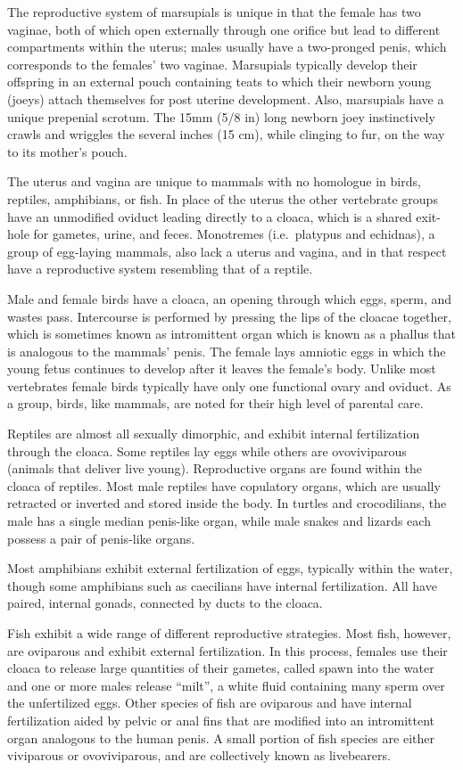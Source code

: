 The reproductive system of marsupials is unique in that the female has two vaginae, both of which open externally through one orifice but lead to different compartments within the uterus; males usually have a two-pronged penis, which corresponds to the females' two vaginae. Marsupials typically develop their offspring in an external pouch containing teats to which their newborn young (joeys) attach themselves for post uterine development. Also, marsupials have a unique prepenial scrotum. The 15mm (5/8 in) long newborn joey instinctively crawls and wriggles the several inches (15 cm), while clinging to fur, on the way to its mother's pouch.

The uterus and vagina are unique to mammals with no homologue in birds, reptiles, amphibians, or fish. In place of the uterus the other vertebrate groups have an unmodified oviduct leading directly to a cloaca, which is a shared exit-hole for gametes, urine, and feces. Monotremes (i.e.~platypus and echidnas), a group of egg-laying mammals, also lack a uterus and vagina, and in that respect have a reproductive system resembling that of a reptile.

Male and female birds have a cloaca, an opening through which eggs, sperm, and wastes pass. Intercourse is performed by pressing the lips of the cloacae together, which is sometimes known as intromittent organ which is known as a phallus that is analogous to the mammals' penis. The female lays amniotic eggs in which the young fetus continues to develop after it leaves the female's body. Unlike most vertebrates female birds typically have only one functional ovary and oviduct. As a group, birds, like mammals, are noted for their high level of parental care.

Reptiles are almost all sexually dimorphic, and exhibit internal fertilization through the cloaca. Some reptiles lay eggs while others are ovoviviparous (animals that deliver live young). Reproductive organs are found within the cloaca of reptiles. Most male reptiles have copulatory organs, which are usually retracted or inverted and stored inside the body. In turtles and crocodilians, the male has a single median penis-like organ, while male snakes and lizards each possess a pair of penis-like organs.

Most amphibians exhibit external fertilization of eggs, typically within the water, though some amphibians such as caecilians have internal fertilization. All have paired, internal gonads, connected by ducts to the cloaca.

Fish exhibit a wide range of different reproductive strategies. Most fish, however, are oviparous and exhibit external fertilization. In this process, females use their cloaca to release large quantities of their gametes, called spawn into the water and one or more males release ``milt'', a white fluid containing many sperm over the unfertilized eggs. Other species of fish are oviparous and have internal fertilization aided by pelvic or anal fins that are modified into an intromittent organ analogous to the human penis. A small portion of fish species are either viviparous or ovoviviparous, and are collectively known as livebearers.

